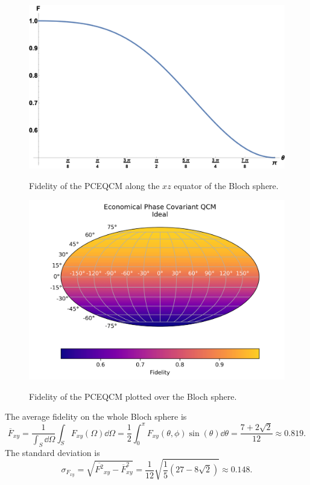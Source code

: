 \begin{figure}[H]
    \begin{minipage}{.5\textwidth}
        \centering
        \includegraphics[width=\textwidth]{Figures/plot_1D_economical_phase_covariant.png}
        \label{fig:economical_phase_covariant_rotated_1d}
        \caption{Fidelity of the PCEQCM along the $xz$ equator of the Bloch sphere.}
      \end{minipage}%
      \begin{minipage}{.5\textwidth}
        \centering
        \includegraphics[width=\textwidth]{Figures/economical_phase_covariant_rotated.png}
        \label{fig:economical_phase_covariant_rotated}
        \caption{Fidelity of the PCEQCM plotted over the Bloch sphere.}
      \end{minipage}
    \end{figure}
The average fidelity on the whole Bloch sphere is
\begin{equation}
    \overline{F}_{xy}=\frac{1}{\int_S \dd{\Omega}}\int_S F_{xy}(\Omega)\dd{\Omega}=\frac{1}{2}\int_0^\pi F_{xy}(\theta,\phi)\sin(\theta)\dd{\theta}=\frac{7+2\sqrt{2}}{12}\approx 0.819.
    \label{eqn:avg_fidelity_epcqcm}
\end{equation}
The standard deviation is
\begin{equation}
    \sigma_{{F}_{xy}}=\sqrt{\overline{F^2}_{xy}-\overline{F}^2_{xy}}
    =\frac{1}{12} \sqrt{\frac{1}{5} \left(27-8 \sqrt{2}\right)}\approx 0.148.
    \label{eqn:std_fidelity_epcqcm}
\end{equation}

